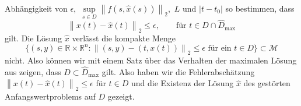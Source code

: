 Abhängigkeit von $\epsilon,$ $\sup\limits_{s \in D}\left\lVert f(s,\hat{x}(s))\right\rVert_2,$  $L$ und $|t-t_0|$ so
bestimmen, dass
\[
    \left\lVert x(t) - \hat{x}(t) \right\rVert_2 \leq \epsilon, \qquad \text{für } t \in D \cap \hat{D}_{\text{max}}
\]
gilt. Die Lösung $\hat{x}$ verlässt die kompakte Menge
\[
    \{(s,y) \in \mathbb{R} \times \mathbb{R}^n: \left\lVert (s,y) - (t,x(t)) \right\rVert_2 \leq \epsilon
    \text{ für ein } t \in D \} \subset \mathcal{M}
\]
nicht. Also können wir mit einem Satz über das Verhalten der maximalen Lösung aus
\cite[Seite 60, Satz 3.21]{beckGewohnlicheDifferentialgleichungen2018} zeigen, dass $D \subset \hat{D}_{\text{max}}$ gilt.
Also haben wir die Fehlerabschätzung $\left\lVert x(t) - \hat{x}(t) \right\rVert_2 \leq \epsilon$
für $t \in D$ und die Existenz der Lösung $\hat{x}$ des gestörten Anfangswertproblems auf $D$ gezeigt. \qedwhite
